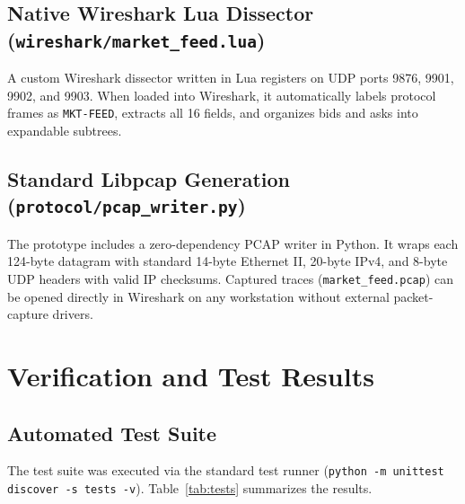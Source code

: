 \documentclass[11pt,a4paper]{article}
\begin{document}
\subsection{Native Wireshark Lua Dissector (\texttt{wireshark/market\_feed.lua})}
A custom Wireshark dissector written in Lua registers on UDP ports 9876, 9901, 9902, and 9903. When loaded into Wireshark, it automatically labels protocol frames as \texttt{MKT-FEED}, extracts all 16 fields, and organizes bids and asks into expandable subtrees.

\subsection{Standard Libpcap Generation (\texttt{protocol/pcap\_writer.py})}
The prototype includes a zero-dependency PCAP writer in Python. It wraps each 124-byte datagram with standard 14-byte Ethernet II, 20-byte IPv4, and 8-byte UDP headers with valid IP checksums. Captured traces (\texttt{market\_feed.pcap}) can be opened directly in Wireshark on any workstation without external packet-capture drivers.

\section{Verification and Test Results}

\subsection{Automated Test Suite}
The test suite was executed via the standard test runner (\texttt{python -m unittest discover -s tests -v}). Table~\ref{tab:tests} summarizes the results.
\end{document}
